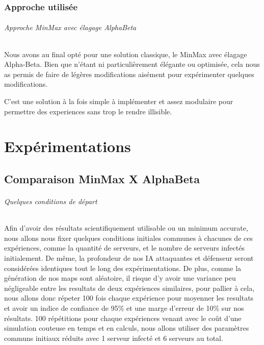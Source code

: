 \documentclass{scrreprt}
\begin{document}
    \section{Approche utilisée}

    \paragraph{Approche MinMax avec élagage AlphaBeta}
    Nous avons au final opté pour une solution classique, le MinMax avec
    élagage Alpha-Beta.
    Bien que n'étant ni particulièrement élégante ou optimisée, cela nous as
    permis de faire de légères modifications aisément pour expérimenter
    quelques modifications.

    \begin{result}
        C'est une solution à la fois simple à implémenter et assez modulaire
        pour permettre des experiences sans trop le rendre illisible.
    \end{result}

    \part{Expérimentations}

    \chapter{Comparaison MinMax X AlphaBeta}

    \paragraph{Quelques conditions de départ}
    Afin d'avoir des résultats scientifiquement utilisable ou un minimum
    accurate, nous allons nous fixer quelques conditions initiales communes à
    chacunes de ces expériences, comme la quantité de serveurs, et le nombre
    de serveurs infectés initialement.
    De même, la profondeur de nos IA attaquantes et défenseur seront
    considérées identiques tout le long des expérimentations.
    De plus, comme la génération de nos maps sont aléatoire, il risque d'y
    avoir une variance peu négligeable entre les resultats de deux
    expériences similaires, pour pallier à cela, nous allons donc répeter 100
    fois chaque expérience pour moyenner les resultats et avoir un indice de
    confiance de 95\% et une marge d'erreur de 10\% sur nos résultats.
    100 répétitions pour chaque expériences venant avec le coût d'une
    simulation couteuse en temps et en calculs, nous allons utiliser des
    paramètres communs initiaux réduits avec 1 serveur infecté et 6 serveurs
    au total.
\end{document}
